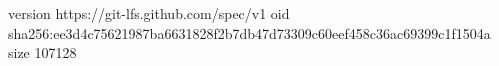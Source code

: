 version https://git-lfs.github.com/spec/v1
oid sha256:ee3d4c75621987ba6631828f2b7db47d73309c60eef458c36ac69399c1f1504a
size 107128
